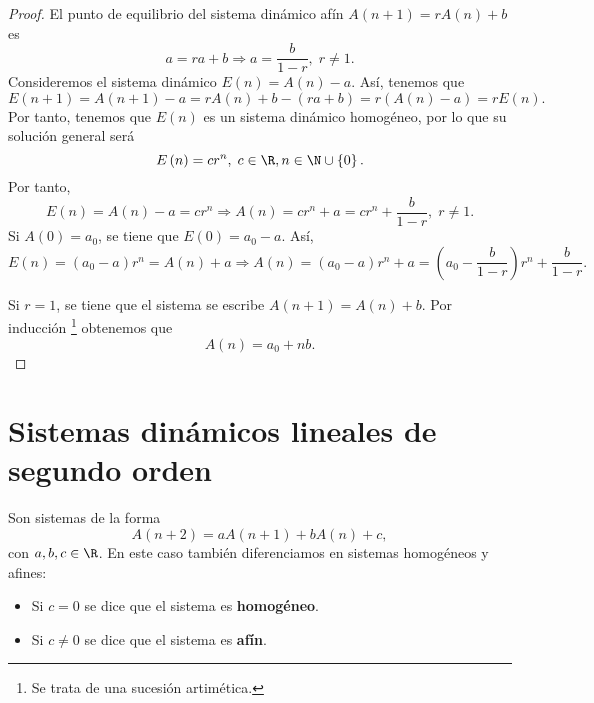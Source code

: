 \begin{proof}
El punto de equilibrio del sistema dinámico afín $\displaystyle A\left(n+1\right) = rA\left(n\right) + b $ es 
\[ a = ra + b \Rightarrow a = \frac{b}{1-r}, \; r \neq 1 .\]
Consideremos el sistema dinámico $\displaystyle E\left(n\right) = A\left(n\right)-a $. Así, tenemos que
\[ E\left(n+1\right) = A\left(n+1\right)-a = rA\left(n\right) + b - \left(ra + b\right) = r\left(A\left(n\right)-a\right) = rE\left(n\right).\]
Por tanto, tenemos que $\displaystyle E\left(n\right) $ es un sistema dinámico homogéneo, por lo que su solución general será
\[E\left(n\right) = cr^{n}, \; c \in \R, n \in \N \cup \left\{ 0\right\}  .\]
Por tanto, 
\[ E\left(n\right) = A\left(n\right) - a = cr^{n} \Rightarrow A\left(n\right) = cr^{n} + a = cr^{n} + \frac{b}{1-r}, \; r \neq 1.\]
Si $\displaystyle A\left(0\right) = a_{0} $, se tiene que $\displaystyle E\left(0\right) = a_{0} - a $. Así,
\[E\left(n\right) = \left(a_{0} - a\right)r^{n} = A\left(n\right) + a \Rightarrow A\left(n\right) = \left(a_{0} - a\right)r^{n} + a= \left(a_{0}-\frac{b}{1-r}\right)r^{n} + \frac{b}{1-r}.\]

Si $\displaystyle r = 1 $, se tiene que el sistema se escribe $\displaystyle A\left(n+1\right) = A\left(n\right) + b $. Por inducción \footnote{Se trata de una sucesión artimética.} obtenemos que
\[A\left(n\right) = a_{0} + nb .\]
\end{proof}
\section{Sistemas dinámicos lineales de segundo orden}
Son sistemas de la forma
\[A\left(n+2\right) = aA\left(n+1\right) + bA\left(n\right) + c ,\]
con $\displaystyle a,b,c \in \R $. En este caso también diferenciamos en sistemas homogéneos y afines:
\begin{itemize}
\item Si $\displaystyle c = 0 $ se dice que el sistema es \textbf{homogéneo}.
\item Si $\displaystyle c \neq 0 $ se dice que el sistema es \textbf{afín}.
\end{itemize}
